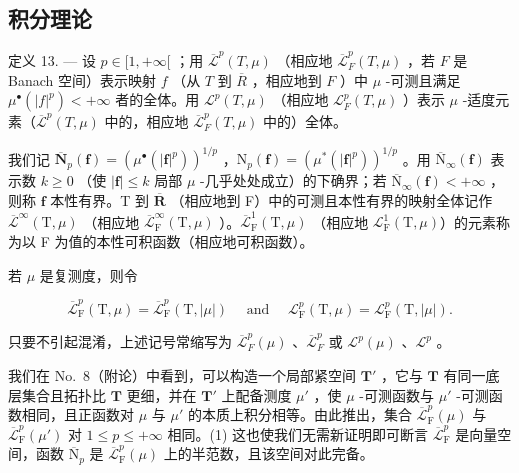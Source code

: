\subsection{积分理论}

定义 13. --- 设 \(p \in [1, +\infty[\) ；用 \(\overline{\mathcal{L}}^p(T, \mu)\) （相应地 \(\overline{\mathcal{L}}_F^p(T, \mu)\) ，若 \(F\) 是 Banach 空间）表示映射 \(f\) （从 \(T\) 到 \(\overline{R}\) ，相应地到 \(F\) ）中 \(\mu\) -可测且满足 \(\mu^\bullet(|f|^p) < +\infty\) 者的全体。用 \(\mathcal{L}^p(T, \mu)\) （相应地 \(\mathcal{L}_F^p(T, \mu)\) ）表示 \(\mu\) -适度元素（\(\overline{\mathcal{L}}^p(T, \mu)\) 中的，相应地 \(\overline{\mathcal{L}}_F^p(T, \mu)\) 中的）全体。

我们记 \(\overline{\mathbf{N}}_p(\mathbf{f}) = (\mu^\bullet (|\mathbf{f}|^p))^{1 / p}\) ，\(\mathrm{N}_p(\mathbf{f}) = (\mu^* (|\mathbf{f}|^p))^{1 / p}\) 。用 \(\overline{\mathrm{N}}_{\infty}(\mathbf{f})\) 表示数 \(k\geqslant 0\) （使 \(|\mathbf{f}|\leqslant k\) 局部 \(\mu\) -几乎处处成立）的下确界；若 \(\overline{\mathrm{N}}_{\infty}(\mathbf{f}) < + \infty\) ，则称 \(\mathbf{f}\) 本性有界。T 到 \(\overline{\mathbf{R}}\) （相应地到 F）中的可测且本性有界的映射全体记作 \(\overline{\mathcal{L}}^{\infty}(\mathrm{T},\mu)\) （相应地 \(\overline{\mathcal{L}}_{\mathrm{F}}^{\infty}(\mathrm{T},\mu)\) ）。\(\overline{\mathcal{L}}_{\mathrm{F}}^{1}(\mathrm{T},\mu)\) （相应地 \(\mathcal{L}_{\mathrm{F}}^{1}(\mathrm{T},\mu)\)）的元素称为以 F 为值的本性可积函数（相应地可积函数）。

若 \(\mu\) 是复测度，则令

\[
\overline {{{{\mathcal {L}}}}} _ {\mathrm{F}} ^ {p} (\mathrm{T}, \mu) = \overline {{{{\mathcal {L}}}}} _ {\mathrm{F}} ^ {p} (\mathrm{T}, | \mu |) \quad \text { and } \quad \mathcal {L} _ {\mathrm{F}} ^ {p} (\mathrm{T}, \mu) = \mathcal {L} _ {\mathrm{F}} ^ {p} (\mathrm{T}, | \mu |).
\]

只要不引起混淆，上述记号常缩写为 \(\overline{\mathcal{L}}_F^p (\mu)\) 、\(\overline{\mathcal{L}}_F^p\) 或 \(\mathcal{L}^p (\mu)\) 、\(\mathcal{L}^p\) 。

我们在 No.~8（附论）中看到，可以构造一个局部紧空间 \(\mathbf{T}'\) ，它与 \(\mathbf{T}\) 有同一底层集合且拓扑比 \(\mathbf{T}\) 更细，并在 \(\mathbf{T}'\) 上配备测度 \(\mu'\) ，使 \(\mu\) -可测函数与 \(\mu'\) -可测函数相同，且正函数对 \(\mu\) 与 \(\mu'\) 的本质上积分相等。由此推出，集合 \(\overline{\mathcal{L}}_{\mathrm{F}}^{p}(\mu)\) 与 \(\overline{\mathcal{L}}_{\mathrm{F}}^{p}(\mu')\) 对 \(1 \leqslant p \leqslant +\infty\) 相同。(1) 这也使我们无需新证明即可断言 \(\overline{\mathcal{L}}_{\mathrm{F}}^{p}\) 是向量空间，函数 \(\overline{\mathrm{N}}_p\) 是 \(\overline{\mathcal{L}}_{\mathrm{F}}^{p}(\mu)\) 上的半范数，且该空间对此完备。

